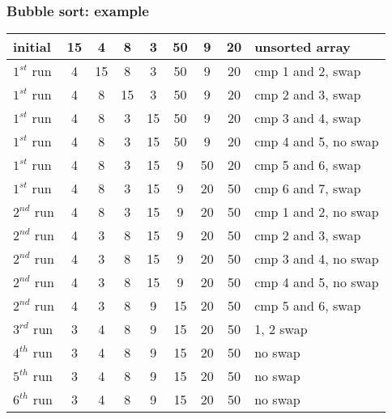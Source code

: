 \documentclass[newPxFont,sthlmFooter,nooffset]{beamer}
\begin{document}
\begin{frame}[t]
  \frametitle{Bubble sort: example}
  \begin{tabular}{p{1.5cm}|| c | c | c | c | c | c | c |p{4cm}}
initial & 15 & 4  & 8  & 3  & 50 & 9 & 20 & unsorted array \\ \hline
$1^{st}$ run & \color{red} 4  & \color{red}15 & 8  & 3  & 50 & 9 & 20 & cmp 1 and 2, swap \pause\\  \hline
$1^{st}$ run & 4  & \color{red}8  & \color{red}15 & 3  & 50 & 9 & 20 & cmp 2 and 3, swap \pause \\ \hline
$1^{st}$ run & 4  & 8  & \color{red}3  & \color{red}15 & 50 & 9 & 20 & cmp 3 and 4, swap \pause \\ \hline
$1^{st}$ run & 4  & 8  & 3  & 15 & 50 & 9 & 20 & cmp 4 and 5, no swap \pause \\ \hline
$1^{st}$ run & 4  & 8  & 3  & 15 & \color{red}9 & \color{red}50 & 20 & cmp 5 and 6, swap \pause \\ \hline
$1^{st}$ run & 4  & 8  & 3  & 15 & 9 & \color{red}20 & \color{red}50 & cmp 6 and 7, swap \pause \\ \hline
$2^{nd}$ run & 4  & 8  & 3  & 15 & 9 & 20 & \color{blue}50 & cmp 1 and 2, no swap  \\ \hline
$2^{nd}$ run & 4  & \color{red}3  & \color{red}8  & 15 & 9 & 20 & \color{blue}50 & cmp 2 and 3,  swap  \\ \hline
$2^{nd}$ run & 4  & 3  & 8  & 15 & 9 & 20 & \color{blue}50 & cmp 3 and 4, no swap  \\ \hline
$2^{nd}$ run & 4  & 3  & 8  & 15 & 9 & 20 & \color{blue}50 & cmp 4 and 5, no swap  \\ \hline
$2^{nd}$ run & 4  & 3  & 8  & \color{red}9  & \color{red}15 & \color{blue}20 & \color{blue}50 & cmp 5 and 6, swap  \\ \hline
$3^{rd}$ run & \color{red}3  & \color{red}4  & 8  & 9  & \color{blue}15 & \color{blue}20 & \color{blue}50 & 1, 2 swap  \\ \hline
$4^{th}$ run & 3  & 4  & 8  & \color{blue}9  & \color{blue}15 & \color{blue}20 & \color{blue}50 & no swap  \\ \hline
$5^{th}$ run & 3  & 4  & \color{blue}8  & \color{blue}9  & \color{blue}15 & \color{blue}20 & \color{blue}50 & no swap  \\ \hline
$6^{th}$ run & 3  & \color{blue}4  & \color{blue}8  & \color{blue}9  & \color{blue}15 & \color{blue}20 & \color{blue}50 & no swap  \\ 
  \end{tabular}
\end{frame}
\end{document}
